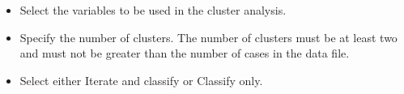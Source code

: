 \documentclass[a4paper,12pt]{article}
\begin{document}
\begin{itemize}
\item 	Select the variables to be used in the cluster analysis. 
\item 	Specify the number of clusters. The number of clusters must be at least two and must not be greater than the number of cases in the data file.
\item 	Select either Iterate and classify or Classify only.
\end{itemize}
\end{document}
